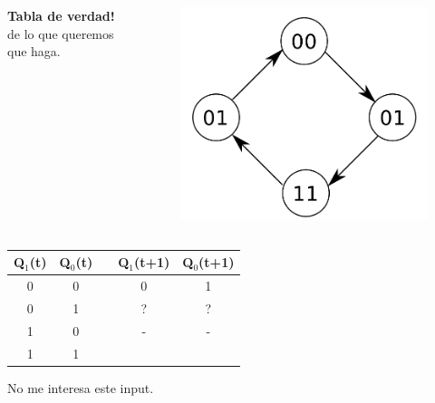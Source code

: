 \documentclass[10pt]{beamer}
\begin{document}
\begin{frame}
{\begin{columns}
            \textbf{Tabla de verdad!} de lo que queremos que haga.
              \begin{figure}[h!]
                  \centering
                  \includegraphics[scale=0.2]{ej1.png}
              \end{figure}
      \end{columns}
        \begin{table}[h!]
      \begin{tabular}{|c|c|c|c|c|}
      \hline
      Q$_1$(t) & Q$_0$(t) &  & Q$_1$(t+1) & Q$_0$(t+1) \\ \hline
      0        & 0        &  & 0          & 1          \\ \hline
      0        & 1        &  & ?          & ?          \\ \hline
      1        & 0        &  & -          & -          \\ \hline
      1        & 1        &  &           &           \\ \hline
      \end{tabular}
      \end{table}
    No me interesa este input.}
\end{frame}
\end{document}
